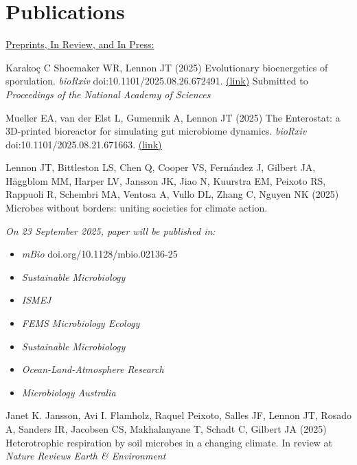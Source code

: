 \documentclass[11pt]{article}
\begin{document}
\section*{Publications}
\vspace{-0.25em} %
\begin{etaremune}

\item[] \textnormal{\underline{Preprints, In Review, and In Press:}}

\item Karakoç C Shoemaker WR, Lennon JT (2025) Evolutionary bioenergetics of sporulation. \textit{bioRxiv} doi:10.1101/2025.08.26.672491. \href{https://www.biorxiv.org/content/10.1101/2025.08.26.672491v1}{(link)} Submitted to \textit{Proceedings of the National Academy of Sciences}

\item Mueller EA, van der Elst L, Gumennik A, Lennon JT (2025) The Enterostat: a 3D-printed bioreactor for simulating gut microbiome dynamics. \textit{bioRxiv} doi:10.1101/2025.08.21.671663. \href{https://www.biorxiv.org/content/10.1101/2025.08.21.671663v1}{(link)}

\item Lennon JT, Bittleston LS, Chen Q, Cooper VS, Fernández J, Gilbert JA, Häggblom MM, Harper LV, Jansson JK, Jiao N, Kuurstra EM, Peixoto RS, Rappuoli R, Schembri MA, Ventosa A, Vullo DL, Zhang C, Nguyen NK (2025) Microbes without borders: uniting societies for climate action. 

\textit{On 23 September 2025, paper will be published in:}
\begin{itemize}
  \item \textit{mBio} doi.org/10.1128/mbio.02136-25
    \item \textit{Sustainable Microbiology}
    \item \textit{ISMEJ}
    \item \textit{FEMS Microbiology Ecology}
    \item \textit{Sustainable Microbiology}  
    \item \textit{Ocean-Land-Atmosphere Research}
    \item \textit{Microbiology Australia}
\end{itemize}

\item Janet K. Jansson, Avi I. Flamholz, Raquel Peixoto, Salles JF, Lennon JT, Rosado A, Sanders IR, Jacobsen CS, Makhalanyane T, Schadt C, Gilbert JA (2025) Heterotrophic respiration by soil microbes in a changing climate. In review at \textit{Nature Reviews Earth \& Environment}


\end{etaremune}
\end{document}
